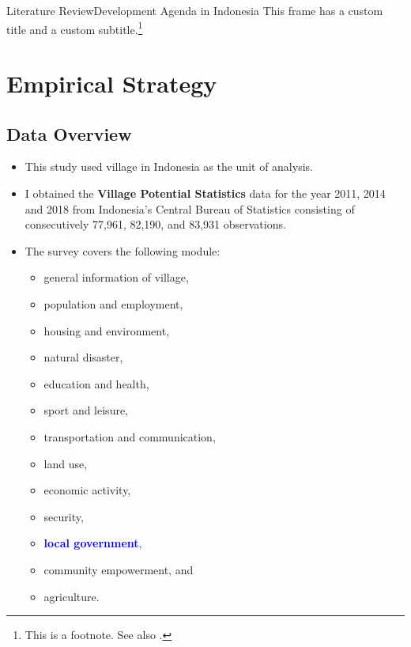 \documentclass[
11pt,notheorems,hyperref={pdfauthor=Maghfira Ramadhani}
]{beamer}
\newcommand{\al}[1]{\textbf{\alert{#1}}}
\newcommand{\alb}[1]{\textbf{\textcolor{blue}{#1}}}
\begin{document}
\begin{frame}{Literature Review}{Development Agenda in Indonesia}
    This frame has a custom title and a custom subtitle.\footnote{This is a footnote. See also \textcite{hartojo_2022}. }
\end{frame}

\section{Empirical Strategy}
\subsection{Data Overview}
\begin{frame}
    \begin{itemize}
        \item This study used village in Indonesia as the unit of analysis. 
        \item I obtained the \al{Village Potential Statistics} data for the year 2011, 2014 and 2018 from Indonesia's Central Bureau of Statistics consisting of consecutively 77,961, 82,190, and 83,931 observations.
        \item The survey covers the following module:
        \begin{multicols}{2}
        \begin{itemize}
            \item general information of village,
            \item population and employment, 
            \item housing and environment, 
            \item natural disaster, 
            \item education and health, 
            \item sport and leisure, 
            \item transportation and communication,
            \item land use,
            \item economic activity, 
            \item security, 
            \item \alb{local government}, 
            \item community empowerment, and \item agriculture.
        \end{itemize}
        \end{multicols}
\end{itemize}
\end{frame}
\end{document}
